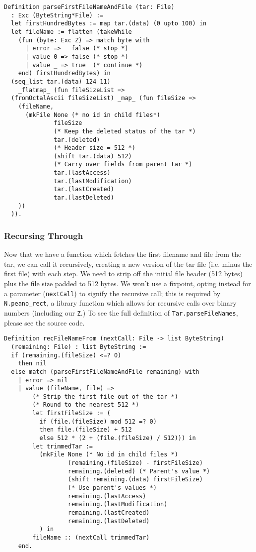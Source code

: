 \documentclass[nocopyrightspace]{sigplanconf}
\begin{document}
\begin{lstlisting}
Definition parseFirstFileNameAndFile (tar: File)
  : Exc (ByteString*File) :=
  let firstHundredBytes := map tar.(data) (0 upto 100) in
  let fileName := flatten (takeWhile 
    (fun (byte: Exc Z) => match byte with
      | error =>   false (* stop *)
      | value 0 => false (* stop *)
      | value _ => true  (* continue *)
    end) firstHundredBytes) in
  (seq_list tar.(data) 124 11) 
    _flatmap_ (fun fileSizeList =>
  (fromOctalAscii fileSizeList) _map_ (fun fileSize =>
    (fileName, 
      (mkFile None (* no id in child files*)
              fileSize
              (* Keep the deleted status of the tar *)
              tar.(deleted)  
              (* Header size = 512 *)
              (shift tar.(data) 512)
              (* Carry over fields from parent tar *)
              tar.(lastAccess)
              tar.(lastModification)
              tar.(lastCreated)
              tar.(lastDeleted)
    ))
  )).
\end{lstlisting}

\subsubsection{Recursing Through}
Now that we have a function which fetches the first filename and file from the
tar, we can call it recursively, creating a new version of the tar file (i.e.
minus the first file) with each step. We need to strip off the initial file
header (512 bytes) plus the file size padded to 512 bytes. We won't use a
fixpoint, opting instead for a parameter ({\tt nextCall}) to signify the
recursive call; this is required by {\tt N.peano\_rect}, a library function
which allows for recursive calls over binary numbers (including our {\tt Z}.)
To see the full definition of {\tt Tar.parseFileNames}, please see the source
code.

\begin{lstlisting}
Definition recFileNameFrom (nextCall: File -> list ByteString) 
  (remaining: File) : list ByteString :=
  if (remaining.(fileSize) <=? 0)
    then nil
  else match (parseFirstFileNameAndFile remaining) with
    | error => nil
    | value (fileName, file) =>
        (* Strip the first file out of the tar *)
        (* Round to the nearest 512 *)
        let firstFileSize := (
          if (file.(fileSize) mod 512 =? 0)
          then file.(fileSize) + 512
          else 512 * (2 + (file.(fileSize) / 512))) in
        let trimmedTar := 
          (mkFile None (* No id in child files *)
                  (remaining.(fileSize) - firstFileSize)
                  remaining.(deleted) (* Parent's value *)
                  (shift remaining.(data) firstFileSize)
                  (* Use parent's values *)
                  remaining.(lastAccess)
                  remaining.(lastModification)
                  remaining.(lastCreated)
                  remaining.(lastDeleted)
          ) in
        fileName :: (nextCall trimmedTar)
    end.
\end{lstlisting}
\end{document}
